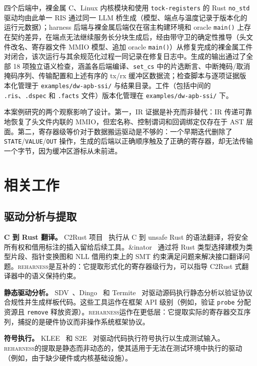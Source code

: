 \documentclass[sigplan, screen, review, anonymous]{acmart}
\newcommand{\reharness}{\textsc{reharness}}
\begin{document}
四个后端中，裸金属 C、Linux 内核模块和使用 \texttt{tock-registers} 的 Rust \texttt{no\_std} 驱动均由此单一 RIS 通过同一 LLM 桥生成（模型、端点与温度记录于版本化的运行元数据）；harness 后端与裸金属后端仅在宿主构建环境和 oracle \texttt{main()} 上存在契约差异，在端点无法继续服务长分块生成后，经由带守卫的确定性推导（头文件改名、寄存器文件 MMIO 模型、追加 oracle \texttt{main()}）从修复完成的裸金属工件对闭合，该次运行与其余规范化过程一同记录在修复日志中。生成的输出通过了全部 18 项独立语义检查，涵盖各后端编译、\texttt{set\_cs} 中的片选断言、中断掩码/取消掩码序列、传输配置和上述有序的 tx/rx 缓冲区数据流；检查脚本与逐项证据版本化管理于 \texttt{examples/dw-apb-ssi/} 与结果目录。工件（包括中间的 \texttt{.ris}、\texttt{.dspec} 和 \texttt{.facts} 文件）版本化管理在 \texttt{examples/dw-apb-ssi/} 下。

本案例研究的两个观察影响了设计。第一，IR 证据是补充而非替代：IR 传递可靠地恢复了头文件内联的 MMIO，但宏名称、控制谓词和回调绑定仅存在于 AST 层面。第二，寄存器级等价对于数据搬运驱动是不够的：一个早期迭代删除了 \texttt{STATE}/\texttt{VALUE}/\texttt{OUT} 操作，生成的后端以正确顺序触及了正确的寄存器，却无法传输一个字节，因为缓冲区游标从未前进。

\section{相关工作}

\subsection{驱动分析与提取}

\textbf{C 到 Rust 翻译。} C2Rust 项目~\cite{emrath2021c2rust} 执行从 C 到 unsafe Rust 的语法翻译，将安全所有权和借用标注的插入留给后续工具。\&inator~\cite{andinator2026} 通过将 Rust 类型选择建模为类型片段、指针变换图和 NLL 借用约束上的 SMT 约束满足问题来解决接口翻译问题。\reharness 是互补的：它提取形式化的寄存器级行为，可以指导 C2Rust 式翻译器中的语义保持约束。

\textbf{静态驱动分析。} SDV~\cite{ball2006thorough}、Dingo~\cite{ryzhyk2009dingo} 和 Termite~\cite{ryzhyk2009termite} 对驱动源码执行静态分析以验证协议合规性并生成样板代码。这些工具运作在框架 API 级别（例如，验证 \texttt{probe} 分配资源且 \texttt{remove} 释放资源）。\reharness 运作在更低层：它提取实际的寄存器交互序列，捕捉的是硬件协议而非操作系统框架协议。

\textbf{符号执行。} KLEE~\cite{cadar2008klee} 和 S2E~\cite{chipounov2011s2e} 对驱动代码执行符号执行以生成测试输入。\reharness 的提取是静态而非动态的，使其适用于无法在测试环境中执行的驱动（例如，由于缺少硬件或内核基础设施）。
\end{document}
